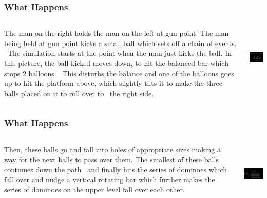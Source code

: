 \begin{frame}
\frametitle{What Happens}
\begin{columns}
\begin{column}{.7\textwidth}
\begin{scriptsize}
The man on the right holds the man on the left at gun point. The man being held at gun point kicks a small ball which sets off a chain of events. \
The simulation starts at the point when the man just kicks the ball. In this picture, the ball kicked moves down, to hit the balanced bar which stops 2 balloons. \
This disturbs the balance and one of the balloons goes up to hit the platform above, which slightly tilts it to make the three balls placed on it to roll over to \
the right side.
\end{scriptsize}
\end{column}
\pause
\begin{column}{.4\textwidth}
\includegraphics[width=4.5cm,height=3cm]{wh1}
\end{column}
\end{columns}
\end{frame}

\begin{frame}
\frametitle{What Happens}
\begin{columns}
\begin{column}{.7\textwidth}
\begin{scriptsize}
Then, these balls go and fall into holes of appropriate sizes making a way for the next balls to pass over them. The smallest of these balls continues down the path \
and finally hits the series of dominoes which fall over and nudge a vertical rotating bar which further makes the series of dominoes on the upper level fall over each other.\
\end{scriptsize}
\end{column}
\pause
\begin{column}{.4\textwidth}
\includegraphics[width=4.5cm,height=3cm]{wh15}
\end{column}
\end{columns}
\end{frame}

